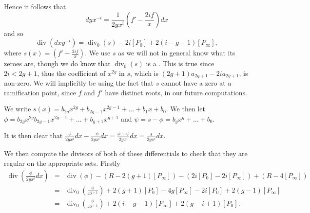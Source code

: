 \documentclass[draft, 11pt]{article} %
\theoremstyle{plain}
\theoremstyle{remark}
\DeclareMathOperator{\di}{div}
\begin{document}
Hence it follows that 
\begin{equation*}
dyx^{-i} = \frac{1}{2yx^{i}}\left( f' - \frac{2if}{x} \right) dx
\end{equation*}
and so
\[
\di (dxy^{-i}) = \di_0(s) -2i[P_0] +2(i-g-1)[P_\infty],
\]
where $s(x) = \left ( f'-\frac{2if}{x} \right )$.
We use $s$ as we will not in general know what its zeroes are, though we do know that $\di_0(s)$ is a .
This is true since $2i <2g+1$, thus the coefficient of $x^{2g}$ in $s$, which is $(2g+1)a_{2g+1}- 2ia_{2g+1}$, is non-zero. 
We will implicitly be using the fact that $s$ cannot have a zero at a ramification point, since $f$ and $f'$ have distinct roots, in our future computations.
\begin{comment}
We could try writing $dyx^{-i}$ as $\frac{1}{2yx^i}dx - (1-s)\frac{1}{2yx^i}dx$.
We then  have 
\[
\di \left( \frac{1}{2yx^i}dx\right) = -\di(y) - \di(x^i) + \di(dx) = (2g+2i-2)[P_\infty] - 2i[P_0]
\]
which has the correct pole at $P_0$ and is otherwise regular.

On the other hand we have
\[
\di\left((1-s)\frac{1}{2yx^i}\right ) dx = \di_0(1-s) -4g[P_\infty] +2(g+i-1)[P_\infty]-2i[P_0] = \di_0(1-s) +2(i-g-1)[P_\infty] - 2i[P_0].
\]

\end{comment}



We write $s(x) = b_{2g}x^{2g} + b_{2g-1}x^{2g-1} + \ldots + b_1x + b_0$.
We then let $\phi = b_{2g} x^{2g} b_{2g-1}x^{2g-1} + \ldots + b_{g+1}x^{g+1} $ and $\psi = s - \phi = b_gx^g + \ldots + b_0$.

It is then clear that $\frac{\phi }{2yx^i}dx - \frac{-\psi}{2yx^i}dx = \frac{\phi + \psi}{2yx^i}dx = \frac{s}{2yx^i}dx$.

We then compute the divisors of both of these differentials to check that they are regular on the appropriate sets.
Firstly
\begin{eqnarray*}
\di\left( \frac{\phi}{2yx^i}dx \right) & = & \di(\phi) - ( R - 2(g+1)[P_\infty]) - (2i[P_0] - 2i[P_\infty]) + (R - 4[P_\infty]) \\
& = & \di_0\left( \frac{\phi}{x^{g+1}}\right) + 2(g+1)[P_0] - 4g[P_\infty] - 2i[P_0] + 2(g-1)[P_\infty] \\
& = & \di_0\left( \frac{\phi}{x^{g+1}} \right) + 2(i-g-1)[P_\infty] + 2(g-i+1)[P_0].
\end{eqnarray*}
\end{document}
